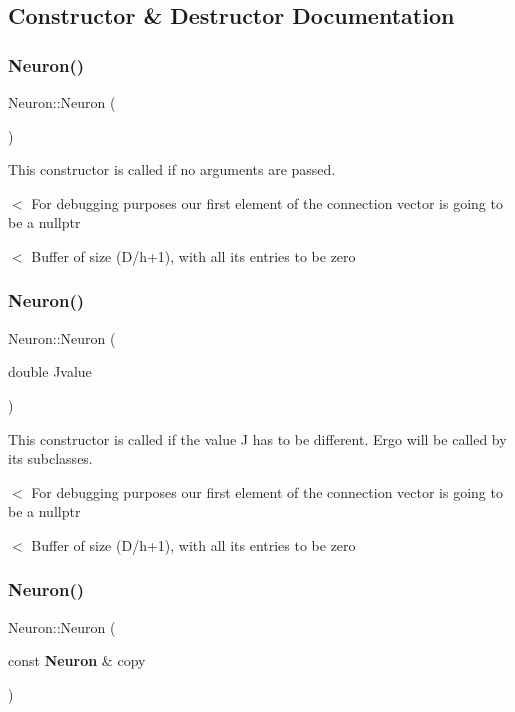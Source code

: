 \subsection{Constructor \& Destructor Documentation}
\mbox{\label{class_neuron_a823487d01615fadb8ac19a2768dd9d96}} 
\subsubsection{Neuron()\hspace{0.1cm}{\footnotesize\ttfamily [1/3]}}
{\footnotesize\ttfamily Neuron\+::\+Neuron (\begin{DoxyParamCaption}{ }\end{DoxyParamCaption})}



This constructor is called if no arguments are passed. 

$<$ For debugging purposes our first element of the connection vector is going to be a nullptr

$<$ Buffer of size (D/h+1), with all its entries to be zero \mbox{\label{class_neuron_a08113313e9b6c871c8ce2e813d7f14d5}} 
\subsubsection{Neuron()\hspace{0.1cm}{\footnotesize\ttfamily [2/3]}}
{\footnotesize\ttfamily Neuron\+::\+Neuron (\begin{DoxyParamCaption}\item[{double}]{Jvalue }\end{DoxyParamCaption})}



This constructor is called if the value J has to be different. Ergo will be called by its subclasses. 

$<$ For debugging purposes our first element of the connection vector is going to be a nullptr

$<$ Buffer of size (D/h+1), with all its entries to be zero \mbox{\label{class_neuron_a12d7fc474ce96416f151099880596cbb}} 
\subsubsection{Neuron()\hspace{0.1cm}{\footnotesize\ttfamily [3/3]}}
{\footnotesize\ttfamily Neuron\+::\+Neuron (\begin{DoxyParamCaption}\item[{const \textbf{ Neuron} \&}]{copy }\end{DoxyParamCaption})\hspace{0.3cm}{\ttfamily [default]}}



